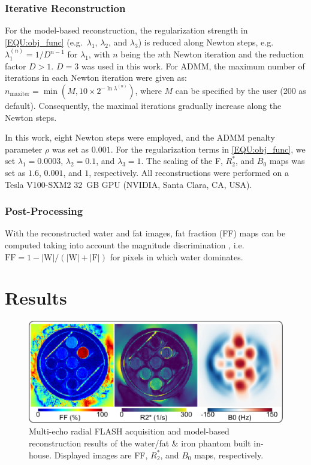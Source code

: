 \documentclass[journal,twoside,web]{ieeecolor}
\begin{document}
\subsubsection*{Iterative Reconstruction}

For the model-based reconstruction, the regularization strength in \cref{EQU:obj_func} 
(e.g.~$\lambda_1$, $\lambda_2$, and $\lambda_3$) 
is reduced along Newton steps, e.g.~$\lambda_1^{(n)} = 1 / D^{n-1}$ for $\lambda_1$, 
with $n$ being the $n$th Newton iteration 
and the reduction factor $D > 1$. 
$D = 3$ was used in this work. 
For ADMM, the maximum number of iterations in each Newton iteration 
were given as:~$n_\text{maxiter} = \min (M, 10 \times 2^{- \ln \lambda^{(n)}})$, 
where $M$ can be specified by the user (\num{200} as default). 
Consequently, the maximal iterations gradually increase along the Newton steps.

In this work, eight Newton steps were employed, 
and the ADMM penalty parameter $\rho$ was set as $0.001$. 
For the regularization terms in \cref{EQU:obj_func}, we set 
$\lambda_1 = 0.0003$, $\lambda_2 = 0.1$, and $\lambda_3 = 1$. 
The scaling of the F, $R_2^*$, and $B_0$ maps was set as 
$1.6$, $0.001$, and $1$, respectively.
All reconstructions were performed on a Tesla V100-SXM2 32~GB GPU 
(NVIDIA, Santa Clara, CA, USA).

\subsubsection*{Post-Processing}

With the reconstructed water and fat images, fat fraction (FF) maps can be computed 
taking into account the magnitude discrimination \cite{liu_2007_ff}, 
i.e.~$\text{FF} = 1 - |\text{W}| / (|\text{W}| + |\text{F}|)$ 
for pixels in which water dominates. 



\section{Results}

\begin{figure}
	\centering
	\includegraphics[width=\columnwidth]{../../figures/tan3.pdf}
	\caption{Multi-echo radial FLASH acquisition and 
		model-based reconstruction results 
		of the water/fat \& iron phantom built in-house. 
		Displayed images are FF, $R_2^*$, and $B_0$ maps, respectively.}
	\label{FIG:PHA}
\end{figure}
\end{document}
